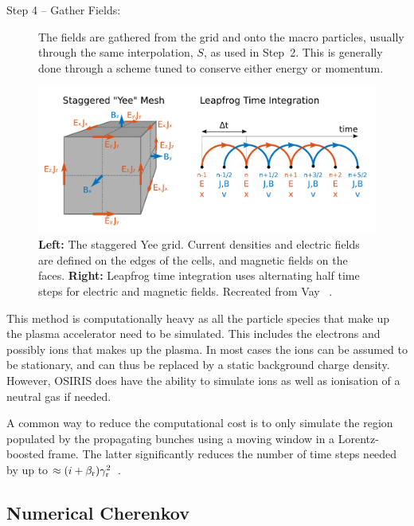 \begin{description}
    \item[Step 4 -- Gather Fields:] The fields are gathered from the grid and onto the macro particles, usually through the same interpolation, $S$, as used in Step~2.
    This is generally done through a scheme tuned to conserve either energy or momentum.
\end{description}

\begin{figure}[hbt]
    \centering
    \includegraphics[width=0.75\linewidth]{figures/EMFSolver}
    \caption{\label{Fig:PIC:EMF}
        \textbf{Left:} The staggered Yee grid. Current densities and electric fields are defined on the edges of the cells, and magnetic fields on the faces.
        \textbf{Right:} Leapfrog time integration uses alternating half time steps for electric and magnetic fields.
        Recreated from Vay \etal~\cite{vay:2016}.
    }
\end{figure}

This method is computationally heavy as all the particle species that make up the plasma accelerator need to be simulated.
This includes the electrons and possibly ions that makes up the plasma.
In most cases the ions can be assumed to be stationary, and can thus be replaced by a static background charge density.
However, OSIRIS does have the ability to simulate ions as well as ionisation of a neutral gas if needed.

A common way to reduce the computational cost is to only simulate the region populated by the propagating bunches using a moving window in a Lorentz-boosted frame.
The latter significantly reduces the number of time steps needed by up to $\approx (i+\beta_{\mathrm{r}})\gamma_{\mathrm{r}}^2$~\cite{vay:2011}.

\subsection{Numerical Cherenkov}
\label{PIC:NumCher}

